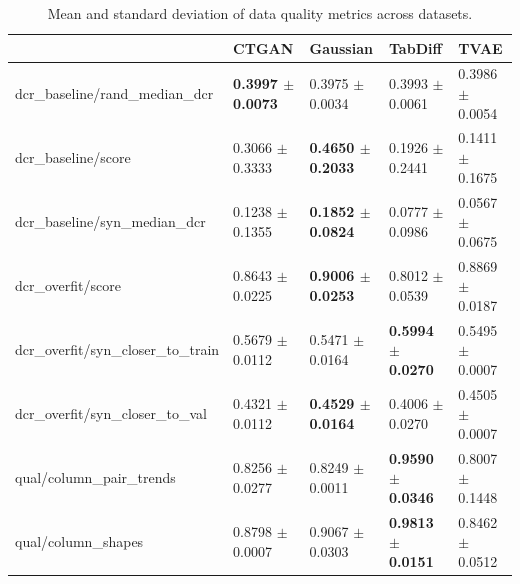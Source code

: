 \begin{table}
\centering
\caption{Mean and standard deviation of data quality metrics across datasets.}
\label{tab:mle_report}
\begin{tabular}{lllll}
\toprule
 & CTGAN & Gaussian & TabDiff & TVAE \\
\midrule
dcr_baseline/rand_median_dcr & \textbf{0.3997 $\pm$ 0.0073} & 0.3975 $\pm$ 0.0034 & 0.3993 $\pm$ 0.0061 & 0.3986 $\pm$ 0.0054 \\
dcr_baseline/score & 0.3066 $\pm$ 0.3333 & \textbf{0.4650 $\pm$ 0.2033} & 0.1926 $\pm$ 0.2441 & 0.1411 $\pm$ 0.1675 \\
dcr_baseline/syn_median_dcr & 0.1238 $\pm$ 0.1355 & \textbf{0.1852 $\pm$ 0.0824} & 0.0777 $\pm$ 0.0986 & 0.0567 $\pm$ 0.0675 \\
dcr_overfit/score & 0.8643 $\pm$ 0.0225 & \textbf{0.9006 $\pm$ 0.0253} & 0.8012 $\pm$ 0.0539 & 0.8869 $\pm$ 0.0187 \\
dcr_overfit/syn_closer_to_train & 0.5679 $\pm$ 0.0112 & 0.5471 $\pm$ 0.0164 & \textbf{0.5994 $\pm$ 0.0270} & 0.5495 $\pm$ 0.0007 \\
dcr_overfit/syn_closer_to_val & 0.4321 $\pm$ 0.0112 & \textbf{0.4529 $\pm$ 0.0164} & 0.4006 $\pm$ 0.0270 & 0.4505 $\pm$ 0.0007 \\
qual/column_pair_trends & 0.8256 $\pm$ 0.0277 & 0.8249 $\pm$ 0.0011 & \textbf{0.9590 $\pm$ 0.0346} & 0.8007 $\pm$ 0.1448 \\
qual/column_shapes & 0.8798 $\pm$ 0.0007 & 0.9067 $\pm$ 0.0303 & \textbf{0.9813 $\pm$ 0.0151} & 0.8462 $\pm$ 0.0512 \\
\bottomrule
\end{tabular}
\end{table}
